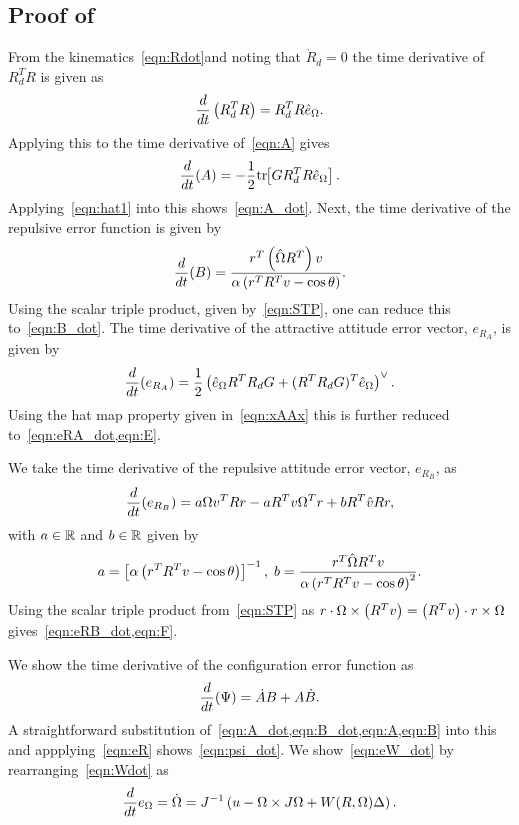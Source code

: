 \documentclass[10pt,fleqn]{IJCAS}  %
\providecommand{\DIFadd}[1]{{\protect\color{blue}\uwave{#1}}} %
\providecommand{\DIFaddbegin}{} %
\providecommand{\DIFaddend}{} %
\begin{document}
\begin{multicols}{2}
\subsection{Proof of~}\label{proof:error_dyn}
From the kinematics~\cref{eqn:Rdot}\DIFaddbegin \DIFadd{, }\DIFaddend and noting that \( \dot{R}_d = 0 \) the time derivative of \( R_d^T R \) is given as
\begin{gather*}
	\frac{d }{d t} \left( R_d^T R \right) = R_d^T R \hat{e}_\Omega .
\end{gather*}
Applying this to the time derivative of~\cref{eqn:A} gives
\begin{gather*}
	\frac{d }{d t} (A) = -\frac{1}{2} \mathrm{tr}\negthickspace\left[ G R_d^T R \hat{e}_\Omega \right] .
\end{gather*}
Applying~\cref{eqn:hat1} into this shows~\cref{eqn:A_dot}.
Next, the time derivative of the repulsive error function is given by
\begin{gather*}
	\frac{d }{d t} (B) = \frac{r^T \left( \hat{\Omega} R^T \right) v}{\alpha \left( r^T R^T v - \cos \theta \right)} .
\end{gather*}
Using the scalar triple product, given by~\cref{eqn:STP}, one can reduce this to~\cref{eqn:B_dot}.
The time derivative of the attractive attitude error vector, \( e_{R_A} \), is given by
\begin{gather*}
	\frac{d }{d t} ( e_{R_A}) = \frac{1}{2} \left( \hat{e}_\Omega R^T R_d G + (R^T R_d G)^T \hat{e}_\Omega \right)^\vee .
\end{gather*}
Using the hat map property given in~\cref{eqn:xAAx} this is further reduced to~\cref{eqn:eRA_dot,eqn:E}.

We take the time derivative of the repulsive attitude error vector, \( e_{R_B} \), as
\begin{gather*}
	\frac{d }{d t}( e_{R_B} )= a \Omega v^T R r - a R^T v \Omega^T r + b R^T \hat{v} R r ,
\end{gather*}
with \( a \in \mathbb{R} \) and \( b \in \mathbb{R}\) given by 
\begin{gather*}
	a = \left[ \alpha \left( r^T R^T v - \cos \theta \right) \right]^{-1} , \;
	b = \frac{r^T \hat{\Omega} R^T v}{\alpha \left( r^T R^T v - \cos \theta \right)^2} .
\end{gather*}
Using the scalar triple product from~\cref{eqn:STP} as \( r \cdot \Omega \times \left( R^T v \right) = \left( R^T v \right) \cdot r \times \Omega \) gives~\cref{eqn:eRB_dot,eqn:F}.

We show the time derivative of the configuration error function as
\begin{gather*}
	\frac{d }{d t} (\Psi) = \dot{A} B + A \dot{B} .
\end{gather*}
A straightforward substitution of~\cref{eqn:A_dot,eqn:B_dot,eqn:A,eqn:B} into this and appplying~\cref{eqn:eR} shows~\cref{eqn:psi_dot}.
We show~\cref{eqn:eW_dot} by rearranging~\cref{eqn:Wdot} as 
\begin{align*}
	\frac{d }{d t} e_\Omega = \dot{\Omega} = J^{-1} \left( u - \Omega \times J \Omega + W(R,\Omega) \Delta  \right) .
\end{align*}


\end{multicols}
\end{document}

